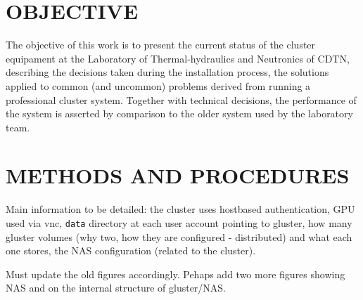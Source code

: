 \documentclass[twoside,a4paper,12pt,english]{inac19}
\begin{document}


\section{OBJECTIVE}

The objective of this work is to present the current status of the cluster equipament 
at the Laboratory of Thermal-hydraulics and Neutronics of CDTN, describing the decisions 
taken during the installation process, the solutions applied to common (and uncommon) problems 
derived from running a professional cluster system. Together with technical decisions, the 
performance of the system is asserted by comparison to the older system used by the laboratory 
team. 

\section{METHODS AND PROCEDURES}

Main information to be detailed: the cluster uses hostbased authentication, GPU used via 
vnc, \texttt{data} directory at each user account pointing to gluster, how many gluster 
volumes (why two, how they are configured - distributed) and what each one stores, 
the NAS configuration (related to the cluster).

Must update the old figures accordingly. Pehaps add two more figures showing NAS 
and on the internal structure of gluster/NAS.
\end{document}
